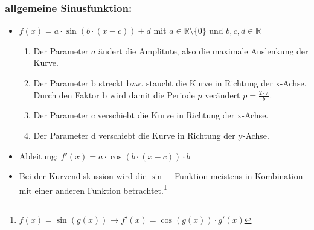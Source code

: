 \documentclass[a4paper,twocolumn,10pt]{onepgnote}
\begin{document}
 \subsubsection{allgemeine Sinusfunktion:} 
 \begin{itemize}
 \item $ f(x)= a\cdot \sin{(b\cdot (x - c))}+d $ mit  $a\in \mathds{R}\setminus\{0\}$ und $b,c,d \in \mathds{R}$
 \begin{enumerate}
\item Der Parameter $a$ ändert die Amplitute, also die maximale Auslenkung der Kurve.\\
\item Der Parameter b streckt bzw. staucht die Kurve in Richtung der x-Achse. Durch den Faktor b wird damit die Periode $p$ verändert $p = \frac{2\cdot \pi}{b}$.\\
        \item Der Parameter c verschiebt die Kurve in Richtung der x-Achse.\\
        \item Der Parameter d verschiebt die Kurve in Richtung der y-Achse.
 \end{enumerate}
 \item Ableitung: $f'(x)=  a\cdot \cos{(b\cdot (x - c))}\cdot b $
 \item Bei der Kurvendiskussion wird die $\sin-$Funktion meistens in Kombination mit einer anderen Funktion betrachtet.\footnote{$f(x) = \sin{(g(x))}  \longrightarrow f'(x) = \cos{(g(x))}\cdot g'(x) $}
 \end{itemize}
\end{document}
